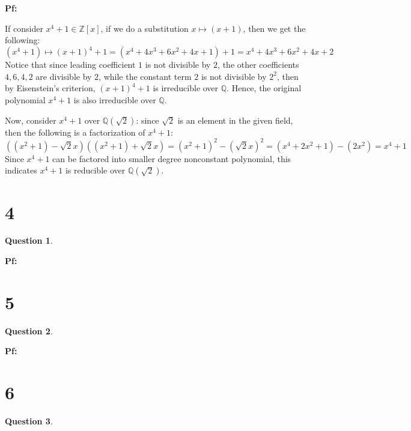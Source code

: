 \documentclass{article}
\newtheorem{question}{Question}
\begin{document}
\textbf{Pf:}

If consider $x^4+1\in \mathbb{Z}[x]$, if we do a substitution $x\mapsto (x+1)$, then we get the following:
$$(x^4+1)\mapsto (x+1)^4+1 =(x^4+4x^3+6x^2+4x+1)+1 = x^4+4x^3+6x^2+4x+2$$
Notice that since leading coefficient $1$ is not divisible by $2$, the other coefficients $4,6,4,2$ are divisible by $2$,
while the constant term $2$ is not divisible by $2^2$, then by Eisenstein's criterion, $(x+1)^4+1$ is irreducible over $\mathbb{Q}$.
Hence, the original polynomial $x^4+1$ is also irreducible over $\mathbb{Q}$.

\hfil

Now, consider $x^4+1$ over $\mathbb{Q}(\sqrt{2})$: since $\sqrt{2}$ is an element in the given field, then the following is a factorization of $x^4+1$:
$$((x^2+1)-\sqrt{2}x)((x^2+1)+\sqrt{2}x)=(x^2+1)^2-(\sqrt{2}x)^2=(x^4+2x^2+1)-(2x^2)=x^4+1$$
Since $x^4+1$ can be factored into smaller degree nonconstant polynomial, this indicates $x^4+1$ is reducible over $\mathbb{Q}(\sqrt{2})$.

\break

\section*{4}
\begin{myBox}[]{}
    \begin{question}
        
    \end{question}
\end{myBox}

\textbf{Pf:}

\break

\section*{5}
\begin{myBox}[]{}
    \begin{question}
        
    \end{question}
\end{myBox}

\textbf{Pf:}

\break

\section*{6}
\begin{myBox}[]{}
    \begin{question}
        
    \end{question}
\end{myBox}
\end{document}
